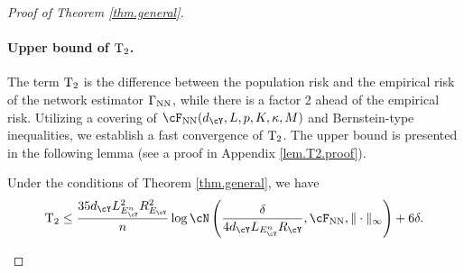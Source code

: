 \documentclass[11pt]{article} %
\begin{document}
\begin{proof}[Proof of Theorem \ref{thm.general}]
\paragraph{Upper bound of ${\rm T_2}$.}
The term ${\rm T_2}$ is the difference between the population risk and the empirical risk of the network estimator $\Gamma_{\rm NN}$, while there is a factor 2 ahead of the empirical risk. %
Utilizing a covering of $\cF_{\rm NN}(d_{\cY},L,p,K,\kappa,M)$ and Bernstein-type inequalities, we establish a fast convergence of ${\rm T_2}$. The upper bound is presented in the following lemma (see a proof in Appendix \ref{lem.T2.proof}).
\begin{lemma}\label{lem.T2}
	Under the conditions of Theorem \ref{thm.general}, we have
	\begin{align}
		{\rm T_2}\leq \frac{35d_{\cY}L_{E^n_{\cY}}^2R_{E_{\cY}}^2}{n}\log \cN\left(\frac{\delta}{4d_{\cY}L_{E^n_{\cY}}R_{\cY}},\cF_{\rm NN},\|\cdot\|_{\infty}\right)+6\delta.
		\label{eq.T2.3}
	\end{align}
\end{lemma}






\end{proof}
\end{document}
